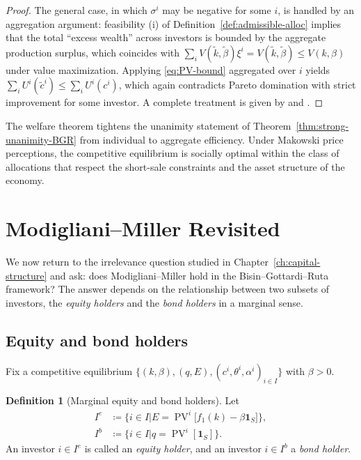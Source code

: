 \documentclass[11pt,a4paper,oneside]{book}
\def\1{\mathbf{1}}
\def\leq{\leqslant}
\DeclareMathOperator{\PV}{PV}
\theoremstyle{plain}
\theoremstyle{definition}
\newtheorem{definition}[theorem]{Definition}
\theoremstyle{remark}
\numberwithin{equation}{chapter}
\begin{document}
\begin{proof}
The general case, in which $\sigma^i$ may be negative for some $i$, is handled by an aggregation argument: feasibility (i) of Definition~\ref{def:admissible-alloc} implies that the total ``excess wealth'' across investors is bounded by the aggregate production surplus, which coincides with $\sum_i V(\widetilde{k}, \widetilde{\beta}) \xi^i = V(\widetilde{k}, \widetilde{\beta}) \leq V(k, \beta)$ under value maximization.
Applying \eqref{eq:PV-bound} aggregated over $i$ yields $\sum_i U^i(\widetilde{c}^i) \leq \sum_i U^i(c^i)$, which again contradicts Pareto domination with strict improvement for some investor.
A complete treatment is given by \citet{BisinGottardiRuta2014} and \citet{Makowski1980}.
\end{proof}

The welfare theorem tightens the unanimity statement of Theorem~\ref{thm:strong-unanimity-BGR} from individual to aggregate efficiency.
Under Makowski price perceptions, the competitive equilibrium is socially optimal within the class of allocations that respect the short-sale constraints and the asset structure of the economy.

\section{Modigliani--Miller Revisited}
\label{sec:MM-BGR}

We now return to the irrelevance question studied in Chapter~\ref{ch:capital-structure} and ask: does Modigliani--Miller hold in the Bisin--Gottardi--Ruta framework?
The answer depends on the relationship between two subsets of investors, the \emph{equity holders} and the \emph{bond holders} in a marginal sense.

\subsection{Equity and bond holders}

Fix a competitive equilibrium $\bigl\{ (k, \beta), (q, E), (c^i, \theta^i, \alpha^i)_{i \in I} \bigr\}$ with $\beta > 0$.

\begin{definition}[Marginal equity and bond holders]\label{def:marginal-holders}
Let
\begin{align*}
  I^e &\coloneqq \bigl\{ i \in I \vert E = \PV^i\bigl[ f_1(k) - \beta \1_S \bigr] \bigr\}, \\
  I^b &\coloneqq \bigl\{ i \in I \vert q = \PV^i[\1_S] \bigr\}.
\end{align*}
An investor $i \in I^e$ is called an \emph{equity holder}, and an investor $i \in I^b$ a \emph{bond holder}.
\end{definition}
\end{document}
